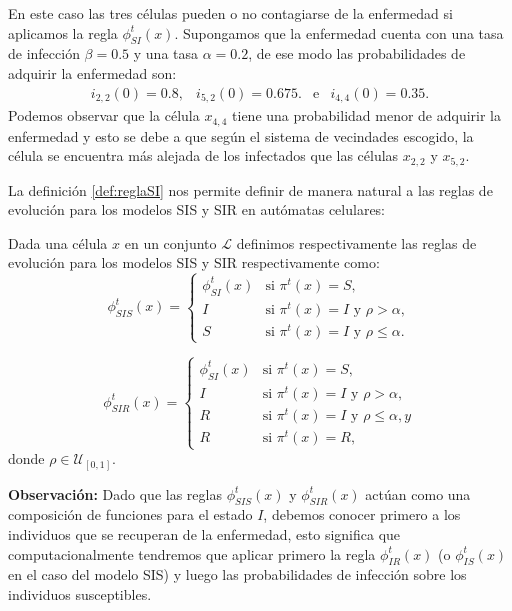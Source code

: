 \begin{example}
En este caso las tres células pueden o no contagiarse de la enfermedad si aplicamos la regla $\phi_{SI}^t(x)$. Supongamos que la enfermedad cuenta con una tasa de infección $\beta=0.5$ y una tasa $\alpha=0.2$, de ese modo las probabilidades de adquirir la enfermedad son:
$$\begin{array}{ccccc}
    i_{2,2}(0)=0.8, & i_{5,2}(0)=0.675. & \text{e} & i_{4,4}(0)=0.35.
\end{array}$$
Podemos observar que la célula $x_{4,4}$ tiene una probabilidad menor de adquirir la enfermedad y esto se debe a que según el sistema de vecindades escogido, la célula se encuentra más alejada de los infectados que las células $x_{2,2}$ y $x_{5,2}$.
\end{example}

La definición \ref{def:reglaSI} nos permite definir de manera natural a las reglas de evolución para los modelos SIS y SIR en autómatas celulares:

\begin{definition}\label{def:reglasSISySIR}
Dada una célula $x$ en un conjunto $\mathcal{L}$ definimos respectivamente las reglas de evolución para los modelos SIS y SIR respectivamente como:
\begin{equation}
    \phi_{SIS}^t(x)=\left\{\begin{array}{ll}
        \phi_{SI}^t(x) & \text{si }\pi^t(x) = S,\\
        I & \text{si }\pi^t(x)=I\text{ y }\rho>\alpha,\\
        S & \text{si }\pi^t(x)=I\text{ y }\rho\leq\alpha.
    \end{array}\right.
\end{equation}

\begin{equation}
    \phi_{SIR}^t(x)=\left\{\begin{array}{ll}
        \phi_{SI}^t(x) & \text{si }\pi^t(x) = S,\\
        I & \text{si }\pi^t(x)=I\text{ y }\rho>\alpha,\\
        R & \text{si }\pi^t(x)=I\text{ y }\rho\leq\alpha, y \\
        R & \text{si }\pi^t(x)=R,
    \end{array}\right.
\end{equation}
donde $\rho\in\mathcal{U}_{[0,1]}$.
\end{definition}

\textbf{Observación:} Dado que las reglas $\phi_{SIS}^t(x)$ y $\phi_{SIR}^t(x)$ actúan como una composición de funciones para el estado $I$, debemos conocer primero a los individuos que se recuperan de la enfermedad, esto significa que computacionalmente tendremos que aplicar primero la regla $\phi_{IR}^t(x)$ (o $\phi_{IS}^t(x)$ en el caso del modelo SIS) y luego las probabilidades de infección sobre los individuos susceptibles.

